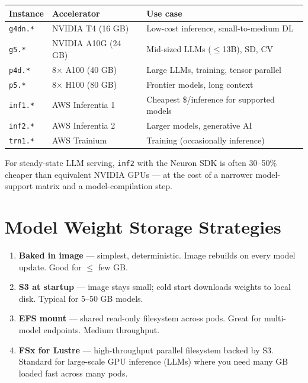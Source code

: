 \documentclass[11pt,a4paper]{article}
\begin{document}
\begin{longtable}{p{3.5cm} p{5cm} p{6cm}}
\toprule
\textbf{Instance} & \textbf{Accelerator} & \textbf{Use case} \\
\midrule
\texttt{g4dn.*} & NVIDIA T4 (16 GB) & Low-cost inference, small-to-medium DL \\
\texttt{g5.*}   & NVIDIA A10G (24 GB) & Mid-sized LLMs ($\leq$13B), SD, CV \\
\texttt{p4d.*}  & 8$\times$ A100 (40 GB) & Large LLMs, training, tensor parallel \\
\texttt{p5.*}   & 8$\times$ H100 (80 GB) & Frontier models, long context \\
\texttt{inf1.*} & AWS Inferentia 1 & Cheapest \$/inference for supported models \\
\texttt{inf2.*} & AWS Inferentia 2 & Larger models, generative AI \\
\texttt{trn1.*} & AWS Trainium & Training (occasionally inference) \\
\bottomrule
\end{longtable}

\begin{tipbox}
For steady-state LLM serving, \texttt{inf2} with the Neuron SDK is often
30--50\% cheaper than equivalent NVIDIA GPUs --- at the cost of a narrower
model-support matrix and a model-compilation step.
\end{tipbox}

\section{Model Weight Storage Strategies}

\begin{enumerate}[leftmargin=*]
    \item \textbf{Baked in image} --- simplest, deterministic. Image rebuilds
          on every model update. Good for $\leq$ few GB.
    \item \textbf{S3 at startup} --- image stays small; cold start downloads
          weights to local disk. Typical for 5--50 GB models.
    \item \textbf{EFS mount} --- shared read-only filesystem across pods. Great
          for multi-model endpoints. Medium throughput.
    \item \textbf{FSx for Lustre} --- high-throughput parallel filesystem
          backed by S3. Standard for large-scale GPU inference (LLMs) where
          you need many GB loaded fast across many pods.
\end{enumerate}
\end{document}
